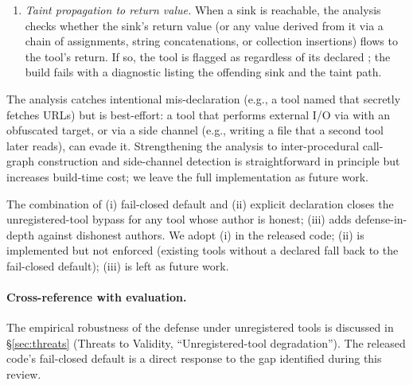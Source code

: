 \begin{enumerate}[leftmargin=*]
\begin{enumerate}[leftmargin=*,label=(\alph*)]
        \item \emph{Taint propagation to return value.} When a sink is reachable, the analysis checks whether the sink's return value (or any value derived from it via a chain of assignments, string concatenations, or collection insertions) flows to the tool's  return. If so, the tool is flagged as  regardless of its declared ; the build fails with a diagnostic listing the offending sink and the taint path.
    \end{enumerate}
    The analysis catches intentional mis-declaration (e.g., a tool named  that secretly fetches URLs) but is best-effort: a tool that performs external I/O via  with an obfuscated target, or via a side channel (e.g., writing a file that a second tool later reads), can evade it. Strengthening the analysis to inter-procedural call-graph construction and side-channel detection is straightforward in principle but increases build-time cost; we leave the full implementation as future work.
\end{enumerate}

The combination of (i) fail-closed default and (ii) explicit declaration closes the unregistered-tool bypass for any tool whose author is honest; (iii) adds defense-in-depth against dishonest authors. We adopt (i) in the released code; (ii) is implemented but not enforced (existing tools without a declared  fall back to the fail-closed default); (iii) is left as future work.

\paragraph{Cross-reference with evaluation.}
The empirical robustness of the defense under unregistered tools is discussed in \S\ref{sec:threats} (Threats to Validity, ``Unregistered-tool degradation''). The released code's fail-closed default is a direct response to the gap identified during this review.
